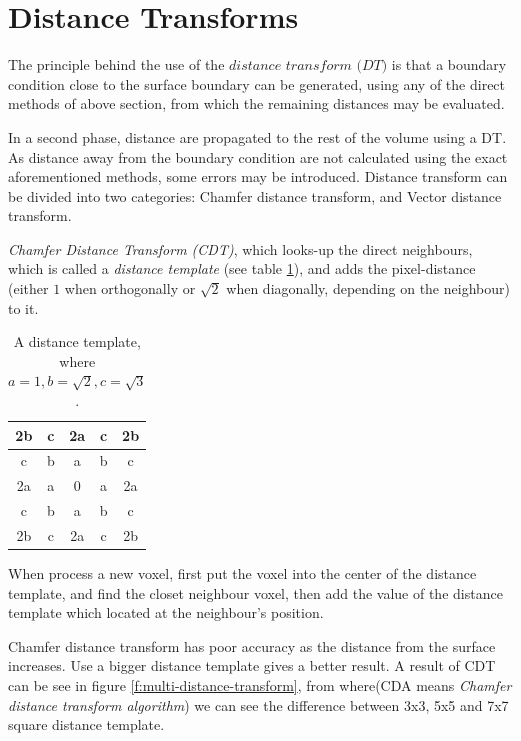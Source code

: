 \section{Distance Transforms}
The principle behind the use of the $\textit{distance transform (DT)}$ is that a boundary condition close to the surface boundary can be generated, using any of the direct methods of above section, from which the remaining distances may be evaluated.

In a second phase, distance are propagated to the rest of the volume using a DT.  As distance away from the boundary condition are not calculated using the exact aforementioned methods, some errors may be introduced. Distance transform can be divided into two categories: Chamfer distance transform, and Vector distance transform.

\textit{Chamfer Distance Transform (CDT)}, which looks-up the direct neighbours, which is called a \textit{distance template} (see table \ref{t:distance-template}), and adds the pixel-distance (either $1$ when orthogonally or $\sqrt{2}$ when diagonally, depending on the neighbour) to it.

\begin{table}
\begin{center}
	\begin{tabular}{|c|c|c|c|c|}
		\hline
		2b&c&2a&c&2b\\
		\hline
		c&b&a&b&c\\
		\hline
		2a&a&0&a&2a\\
		\hline
		c&b&a&b&c\\
		2b&c&2a&c&2b\\
		\hline
	\end{tabular}
\end{center}
\caption{A distance template, where $a=1,b=\sqrt{2},c=\sqrt{3}$.}
\label{t:distance-template}
\end{table}

When process a new voxel, first put the voxel into the center of the distance template, and find the closet neighbour voxel, then add the value of the distance template which located at the neighbour's position.  

Chamfer distance transform has poor accuracy as the distance from the surface increases. Use a bigger distance template gives a better result. A result of CDT can be see in figure \ref{f:multi-distance-transform}, from where(CDA means \textit{Chamfer distance transform algorithm}) we can see the difference between 3x3, 5x5 and 7x7 square distance template.

